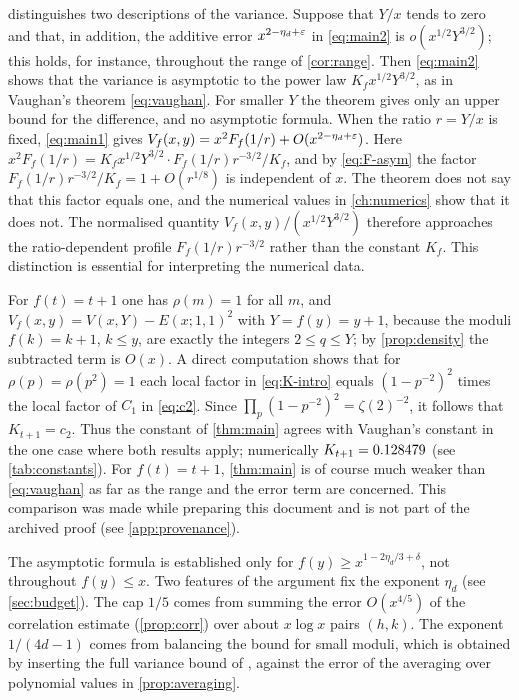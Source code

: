 \begin{remark}\label{rem:regimes}
 distinguishes two descriptions of the variance. Suppose that $Y/x$ tends to zero and that, in addition, the additive error $x^{2-\eta_d+\varepsilon}$ in \eqref{eq:main2} is $o(x^{1/2}Y^{3/2})$; this holds, for instance, throughout the range of \cref{cor:range}. Then \eqref{eq:main2} shows that the variance is asymptotic to the power law $K_fx^{1/2}Y^{3/2}$, as in Vaughan's theorem \eqref{eq:vaughan}. For smaller $Y$ the theorem gives only an upper bound for the difference, and no asymptotic formula. When the ratio $r=Y/x$ is fixed, \eqref{eq:main1} gives $V_f(x,y)=x^2F_f(1/r)+O(x^{2-\eta_d+\varepsilon})$. Here $x^2F_f(1/r)=K_fx^{1/2}Y^{3/2}\cdot F_f(1/r)r^{-3/2}/K_f$, and by \eqref{eq:F-asym} the factor $F_f(1/r)r^{-3/2}/K_f=1+O(r^{1/8})$ is independent of $x$. The theorem does not say that this factor equals one, and the numerical values in \cref{ch:numerics} show that it does not. The normalised quantity $V_f(x,y)/(x^{1/2}Y^{3/2})$ therefore approaches the ratio-dependent profile $F_f(1/r)r^{-3/2}$ rather than the constant $K_f$. This distinction is essential for interpreting the numerical data.
\end{remark}

\begin{remark}\label{rem:vaughan}
For $f(t)=t+1$ one has $\rho(m)=1$ for all $m$, and $V_f(x,y)=V(x,Y)-E(x;1,1)^2$ with $Y=f(y)=y+1$, because the moduli $f(k)=k+1$, $k\le y$, are exactly the integers $2\le q\le Y$; by \cref{prop:density} the subtracted term is $O(x)$. A direct computation shows that for $\rho(p)=\rho(p^2)=1$ each local factor in \eqref{eq:K-intro} equals $(1-p^{-2})^2$ times the local factor of $C_1$ in \eqref{eq:c2}. Since $\prod_p(1-p^{-2})^2=\zeta(2)^{-2}$, it follows that $K_{t+1}=c_2$. Thus the constant of \cref{thm:main} agrees with Vaughan's constant in the one case where both results apply; numerically $K_{t+1}=0.128479$ (see \cref{tab:constants}). For $f(t)=t+1$, \cref{thm:main} is of course much weaker than \eqref{eq:vaughan} as far as the range and the error term are concerned. This comparison was made while preparing this document and is not part of the archived proof (see \cref{app:provenance}).
\end{remark}

\begin{remark}[Limitations]
The asymptotic formula is established only for $f(y)\ge x^{1-2\eta_d/3+\delta}$, not throughout $f(y)\le x$. Two features of the argument fix the exponent $\eta_d$ (see \cref{sec:budget}). The cap $1/5$ comes from summing the error $O(x^{4/5})$ of the correlation estimate (\cref{prop:corr}) over about $x\log x$ pairs $(h,k)$. The exponent $1/(4d-1)$ comes from balancing the bound for small moduli, which is obtained by inserting the full variance bound of \cite{bgpvw1998}, against the error of the averaging over polynomial values in \cref{prop:averaging}.
\end{remark}

